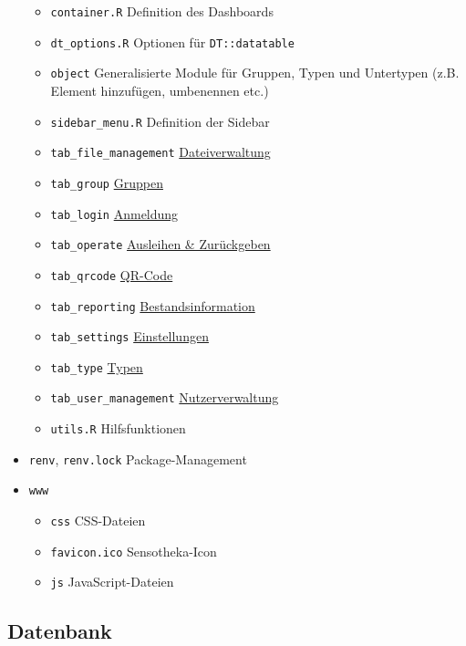 \documentclass[
]{article}
\providecommand{\tightlist}{%
  \setlength{\itemsep}{0pt}\setlength{\parskip}{0pt}}
\begin{document}
\begin{itemize}
  \begin{itemize}
  \tightlist
  \item
    \texttt{container.R} Definition des Dashboards
  \item
    \texttt{dt\_options.R} Optionen für \texttt{DT::datatable}
  \item
    \texttt{object} Generalisierte Module für Gruppen, Typen und Untertypen (z.B. Element hinzufügen, umbenennen etc.)
  \item
    \texttt{sidebar\_menu.R} Definition der Sidebar
  \item
    \texttt{tab\_file\_management} \protect\hyperlink{file-management}{Dateiverwaltung}
  \item
    \texttt{tab\_group} \protect\hyperlink{groups}{Gruppen}
  \item
    \texttt{tab\_login} \protect\hyperlink{login}{Anmeldung}
  \item
    \texttt{tab\_operate} \protect\hyperlink{operate}{Ausleihen \& Zurückgeben}
  \item
    \texttt{tab\_qrcode} \protect\hyperlink{qrcode}{QR-Code}
  \item
    \texttt{tab\_reporting} \protect\hyperlink{reporting}{Bestandsinformation}
  \item
    \texttt{tab\_settings} \protect\hyperlink{settings}{Einstellungen}
  \item
    \texttt{tab\_type} \protect\hyperlink{type}{Typen}
  \item
    \texttt{tab\_user\_management} \protect\hyperlink{user-management}{Nutzerverwaltung}
  \item
    \texttt{utils.R} Hilfsfunktionen
  \end{itemize}
\item
  \texttt{renv}, \texttt{renv.lock} Package-Management
\item
  \texttt{www}

  \begin{itemize}
  \tightlist
  \item
    \texttt{css} CSS-Dateien
  \item
    \texttt{favicon.ico} Sensotheka-Icon
  \item
    \texttt{js} JavaScript-Dateien
  \end{itemize}
\end{itemize}

\hypertarget{database}{%
\subsection{Datenbank}\label{database}}
\end{document}
